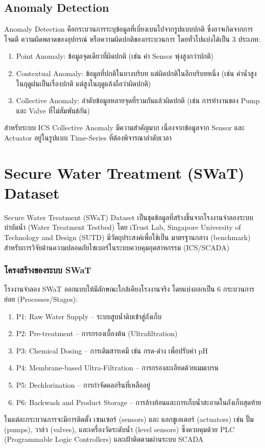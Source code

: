 \subsection{Anomaly Detection}
\hspace{2em} Anomaly Detection คือกระบวนการระบุข้อมูลที่เบี่ยงเบนไปจากรูปแบบปกติ ซึ่งอาจเกิดจากการโจมตี ความผิดพลาดของอุปกรณ์ หรือความผิดปกติของกระบวนการ โดยทั่วไปแบ่งได้เป็น 3 ประเภท:

\begin{enumerate}
  \item Point Anomaly: ข้อมูลจุดเดียวที่ผิดปกติ (เช่น ค่า Sensor พุ่งสูงกว่าปกติ)
  \item Contextual Anomaly: ข้อมูลที่ปกติในบางบริบท แต่ผิดปกติในอีกบริบทหนึ่ง (เช่น ค่าน้ำสูงในฤดูฝนเป็นเรื่องปกติ แต่สูงในฤดูแล้งถือว่าผิดปกติ)
  \item Collective Anomaly: ลำดับข้อมูลหลายจุดที่รวมกันแล้วผิดปกติ (เช่น การทำงานของ Pump และ Valve ที่ไม่สัมพันธ์กัน)
\end{enumerate}
\indent
สำหรับระบบ ICS Collective Anomaly มีความสำคัญมาก เนื่องจากข้อมูลจาก Sensor และ Actuator อยู่ในรูปแบบ Time-Series ที่ต้องพิจารณาลำดับเวลา

\section{ Secure Water Treatment (SWaT) Dataset}
\hspace{2em} Secure Water Treatment (SWaT) Dataset เป็นชุดข้อมูลที่สร้างขึ้นจากโรงงานจำลองระบบบำบัดน้ำ (Water Treatment Testbed) โดย iTrust Lab, Singapore University of Technology and Design (SUTD) มีวัตถุประสงค์เพื่อใช้เป็น มาตรฐานกลาง (benchmark) สำหรับการวิจัยด้านความปลอดภัยไซเบอร์ในระบบควบคุมอุตสาหกรรม (ICS/SCADA)

\subsubsection{โครงสร้างของระบบ SWaT}
โรงงานจำลอง SWaT ออกแบบให้มีลักษณะใกล้เคียงโรงงานจริง โดยแบ่งออกเป็น 6 กระบวนการย่อย (Processes/Stages):

\begin{enumerate}
  \item P1: Raw Water Supply – ระบบสูบน้ำดิบเข้าสู่ถังเก็บ
  \item P2: Pre-treatment – การกรองเบื้องต้น (Ultrafiltration)
  \item P3: Chemical Dosing – การเติมสารเคมี เช่น กรด-ด่าง เพื่อปรับค่า pH
  \item P4: Membrane-based Ultra-Filtration – การกรองละเอียดด้วยเมมเบรน
  \item P5: Dechlorination – การกำจัดคลอรีนที่เหลืออยู่
  \item P6: Backwash and Product Storage – การล้างย้อนและการเก็บน้ำสะอาดในถังเก็บสุดท้าย
\end{enumerate}
\indent
ในแต่ละกระบวนการจะมีการติดตั้ง เซนเซอร์ (sensors) และ แอกชูเอเตอร์ (actuators) เช่น ปั๊ม (pumps), วาล์ว (valves), และเครื่องวัดระดับน้ำ (level sensors) ซึ่งควบคุมด้วย PLC (Programmable Logic Controllers) และเฝ้าติดตามผ่านระบบ SCADA

